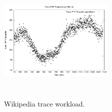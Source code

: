 



\begin{figure}
\begin{center}
\includegraphics[width=0.49\textwidth, height=6cm]{./images/traceWorkload}
\end{center}
\caption{Wikipedia trace workload.}
\label{workload}
\end{figure}





